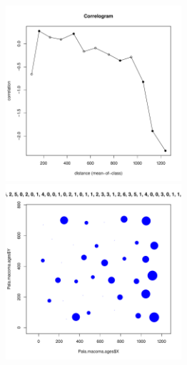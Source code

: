 \begin{figure}[h]
	\begin{minipage}[b]{.46\linewidth}
	\begin{center}
		\includegraphics[width=65mm]{../Barenc_Sea/distribution_Moran/Pala_macoma_age_N5_.pdf}
	\end{center}
	\end{minipage}
	\hfil %
	\begin{minipage}[b]{.46\linewidth}
	\begin{center}
		\includegraphics[width=65mm]{../Barenc_Sea/distribution_Moran/Pala_macoma_age_bubb_N5_.pdf}
	\end{center}
	\end{minipage}

	\end{figure}




